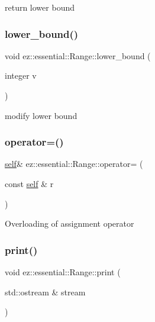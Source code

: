 return lower bound \mbox{\label{classez_1_1essential_1_1Range_a9e2c671e2ce1fbce8aa01f5f515147a9}} 
\subsubsection{\texorpdfstring{lower\+\_\+bound()}{lower\_bound()}\hspace{0.1cm}{\footnotesize\ttfamily [2/2]}}
{\footnotesize\ttfamily void ez\+::essential\+::\+Range\+::lower\+\_\+bound (\begin{DoxyParamCaption}\item[{integer}]{v }\end{DoxyParamCaption})\hspace{0.3cm}{\ttfamily [inline]}}

modify lower bound \mbox{\label{classez_1_1essential_1_1Range_a9d5d4ba46b7d007004e1bae4c0838730}} 
\subsubsection{\texorpdfstring{operator=()}{operator=()}}
{\footnotesize\ttfamily \hyperlink{classez_1_1essential_1_1Range}{self}\& ez\+::essential\+::\+Range\+::operator= (\begin{DoxyParamCaption}\item[{const \hyperlink{classez_1_1essential_1_1Range}{self} \&}]{r }\end{DoxyParamCaption})\hspace{0.3cm}{\ttfamily [inline]}}

Overloading of assignment operator \mbox{\label{classez_1_1essential_1_1Range_a6a05a1d19692f5a289e1cc3b2d62c1e6}} 
\subsubsection{\texorpdfstring{print()}{print()}}
{\footnotesize\ttfamily void ez\+::essential\+::\+Range\+::print (\begin{DoxyParamCaption}\item[{std\+::ostream \&}]{stream }\end{DoxyParamCaption})\hspace{0.3cm}{\ttfamily [inline]}}

